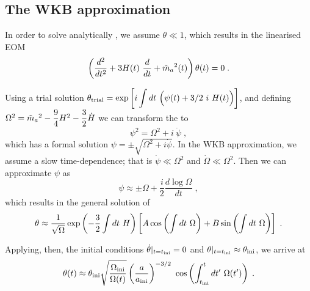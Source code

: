 \documentclass[11pt,a4paper]{article}
\begin{document}
\subsection{The WKB approximation}
%
In order to solve analytically , we assume $\theta \ll 1$, which results in the linearised EOM
%
\begin{equation}
	\left( \dfrac{d^2}{d t^2} + 3 H(t) \ \dfrac{d}{d t} + \tilde m_{a}{}^2(t)  \right) \theta(t) = 0 \; .
	\label{eq:linear_eom}
\end{equation}

Using a trial solution $\theta_{\rm trial} = \exp\left[  i \displaystyle \int d t \ \Big( \psi(t) +3/2 \ i \ H(t) \Big)  \right]$, and defining $\Omega^2 = \tilde m_{a}{}^2 - \dfrac{9}{4} H^2 -  \dfrac{3}{2} \dot H $ we can transform the  to 
%
\begin{equation}
	\psi^2 = \Omega^2 + i \ \dot \psi \; ,
	\label{eq:eom_of_psi}
\end{equation}
%
which has a formal solution $\psi = \pm \sqrt{\Omega^2 + i \dot \psi}$. In the WKB approximation, we assume a slow time-dependence; that is $\dot \psi \ll \Omega^2$ and $\dot \Omega \ll \Omega^2$. Then we can approximate $\psi$ as
%
\begin{equation}
	\psi \approx \pm \Omega + \dfrac{i}{2} \dfrac{d \log \Omega}{d t} \;,
	\label{eq:u_approx}
\end{equation}
%
which results in the general solution of  
%
\begin{equation}
	\theta \approx \dfrac{1}{\sqrt{\Omega}} \exp\left( -\dfrac{3}{2} \int d t \ H \right) \left[  A \cos\left(  \int d t \ \Omega \right) +  B \sin\left(  \int d t \ \Omega \right)     \right] \;. 
	\label{eq:general_solution_eom_approx}
\end{equation}

Applying, then, the initial conditions $ \dot \theta |_{t=t_{\rm ini}{}} = 0$ and  $\theta|_{t=t_{\rm ini}{}} \approx \theta_{\rm ini}{}$, we arrive at 
%
\begin{equation}
\theta(t) \approx \theta_{\rm ini}{} \sqrt{ \dfrac{ \Omega_{\rm ini} }{\Omega (t)} } \left( \dfrac{a}{a_{\rm ini}{}} \right)^{-3/2} \  \cos\left(  \int_{t_{\rm ini}{}}^t d t^\prime  \ \Omega(t^\prime) \right)   \;.
\label{eq:solution_eom_approx} 
\end{equation}
\end{document}
